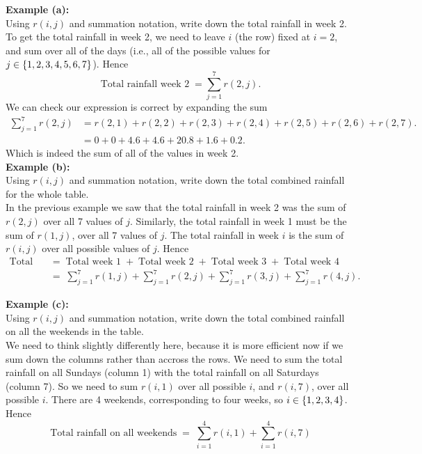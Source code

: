 \noindent \textbf{Example (a):} \\
\noindent Using $r(i,j)$ and summation notation, write down the total rainfall in week 2. \\

\solution
To get the total rainfall in week 2, we need to leave $i$ (the row) fixed at $i = 2$, and sum over all of the days (i.e., all of the possible values for $j \in \left\{1,2,3,4,5,6,7\right\}$). Hence
\[
\text{Total rainfall week 2} \; = \sum_{j = 1}^7 r(2,j).
\]
We can check our expression is correct by expanding the sum
\begin{align*}
\sum_{j = 1}^7 r(2,j) & = r(2,1) + r(2,2) + r(2,3) + r(2,4) + r(2,5) + r(2,6) + r(2,7). \\
	& = 0 + 0 + 4.6 + 4.6 + 20.8 + 1.6 + 0.2.
\end{align*}
Which is indeed the sum of all of the values in week 2. \\

\noindent \textbf{Example (b):} \\ 
\noindent Using $r(i,j)$ and summation notation, write down the total combined rainfall for the whole table. \\

\solution
In the previous example we saw that the total rainfall in week 2 was the sum of $r(2,j)$ over all 7 values of $j$. Similarly, the total rainfall in week 1 must be the sum of $r(1,j)$, over all 7 values of $j$. The total rainfall in week $i$ is the sum of $r(i,j)$ over all possible values of $j$. Hence
\begin{align*}
\text{Total rainfall in table} \; & = \; \text{Total week 1} \; + \; \text{Total week 2} \; + \; \text{Total week 3} \; + \; \text{Total week 4} \\
	& =  \; \sum_{j = 1}^7 r(1,j) + \sum_{j = 1}^7 r(2,j) + \sum_{j = 1}^7 r(3,j) + \sum_{j = 1}^7 r(4,j).
\end{align*}

\noindent \textbf{Example (c):} \\
\noindent Using $r(i,j)$ and summation notation, write down the total combined rainfall on all the weekends in the table. \\

\solution
We need to think slightly differently here, because it is more efficient now if we sum down the columns rather than accross the rows. We need to sum the total rainfall on all Sundays (column 1) with the total rainfall on all Saturdays (column 7). So we need to sum $r(i,1)$ over all possible $i$, and $r(i,7)$, over all possible $i$. There are 4 weekends, corresponding to four weeks, so $i \in \left\{1,2,3,4\right\}$. Hence
\[
\text{Total rainfall on all weekends} \; = \; \sum_{i = 1}^4 r(i,1) + \sum_{i = 1}^4 r(i,7)
\]


